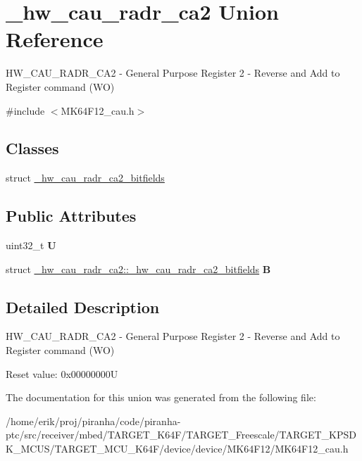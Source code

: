 \hypertarget{union__hw__cau__radr__ca2}{}\section{\+\_\+hw\+\_\+cau\+\_\+radr\+\_\+ca2 Union Reference}
\label{union__hw__cau__radr__ca2}


H\+W\+\_\+\+C\+A\+U\+\_\+\+R\+A\+D\+R\+\_\+\+C\+A2 -\/ General Purpose Register 2 -\/ Reverse and Add to Register command (WO)  




{\ttfamily \#include $<$M\+K64\+F12\+\_\+cau.\+h$>$}

\subsection*{Classes}
\begin{DoxyCompactItemize}
\item 
struct \hyperlink{struct__hw__cau__radr__ca2_1_1__hw__cau__radr__ca2__bitfields}{\+\_\+hw\+\_\+cau\+\_\+radr\+\_\+ca2\+\_\+bitfields}
\end{DoxyCompactItemize}
\subsection*{Public Attributes}
\begin{DoxyCompactItemize}
\item 
uint32\+\_\+t {\bfseries U}\hypertarget{union__hw__cau__radr__ca2_aec430fa995c645fb1e524ac0f695ad27}{}\label{union__hw__cau__radr__ca2_aec430fa995c645fb1e524ac0f695ad27}

\item 
struct \hyperlink{struct__hw__cau__radr__ca2_1_1__hw__cau__radr__ca2__bitfields}{\+\_\+hw\+\_\+cau\+\_\+radr\+\_\+ca2\+::\+\_\+hw\+\_\+cau\+\_\+radr\+\_\+ca2\+\_\+bitfields} {\bfseries B}\hypertarget{union__hw__cau__radr__ca2_a86016e9012c9cb95d2f0a3e5a25397b9}{}\label{union__hw__cau__radr__ca2_a86016e9012c9cb95d2f0a3e5a25397b9}

\end{DoxyCompactItemize}


\subsection{Detailed Description}
H\+W\+\_\+\+C\+A\+U\+\_\+\+R\+A\+D\+R\+\_\+\+C\+A2 -\/ General Purpose Register 2 -\/ Reverse and Add to Register command (WO) 

Reset value\+: 0x00000000U 

The documentation for this union was generated from the following file\+:\begin{DoxyCompactItemize}
\item 
/home/erik/proj/piranha/code/piranha-\/ptc/src/receiver/mbed/\+T\+A\+R\+G\+E\+T\+\_\+\+K64\+F/\+T\+A\+R\+G\+E\+T\+\_\+\+Freescale/\+T\+A\+R\+G\+E\+T\+\_\+\+K\+P\+S\+D\+K\+\_\+\+M\+C\+U\+S/\+T\+A\+R\+G\+E\+T\+\_\+\+M\+C\+U\+\_\+\+K64\+F/device/device/\+M\+K64\+F12/M\+K64\+F12\+\_\+cau.\+h\end{DoxyCompactItemize}
